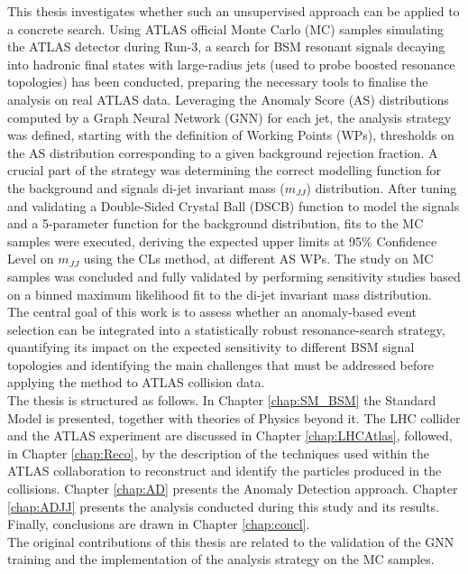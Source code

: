 This thesis investigates whether such an unsupervised approach can be applied to a concrete search. Using ATLAS official Monte Carlo (MC) samples simulating the ATLAS detector during Run-3, a search for BSM resonant signals decaying into hadronic final states with large-radius jets (used to probe boosted resonance topologies) has been conducted, preparing the necessary tools to finalise the analysis on real ATLAS data. Leveraging the Anomaly Score (AS) distributions computed by a Graph Neural Network (GNN) for each jet, the analysis strategy was defined, starting with the definition of Working Points (WPs), thresholds on the AS distribution corresponding to a given background rejection fraction. A crucial part of the strategy was determining the correct modelling function for the background and signals di-jet invariant mass ($m_{JJ}$) distribution. After tuning and validating a Double-Sided Crystal Ball (DSCB) function to model the signals and a 5-parameter function for the background distribution, fits to the MC samples were executed, deriving the expected
upper limits at 95\% Confidence Level on $m_{JJ}$ using the CLs method, at different AS WPs. The study on MC samples was concluded and fully validated by performing sensitivity studies based on a binned maximum likelihood fit to the di-jet invariant mass distribution.\\
The central goal of this work is to assess whether an anomaly-based event selection can be integrated into a statistically robust resonance-search strategy, quantifying its impact on the expected sensitivity to different BSM signal topologies and identifying the main challenges that must be addressed before applying the method to ATLAS collision data.\\
The thesis is structured as follows. In Chapter \ref{chap:SM_BSM} the Standard Model is presented, together with theories of Physics beyond it. 
The LHC collider and the ATLAS experiment are discussed in Chapter \ref{chap:LHCAtlas}, followed, in Chapter \ref{chap:Reco}, by the description of the techniques used within the ATLAS collaboration to reconstruct and identify the particles produced in the collisions.
Chapter \ref{chap:AD} presents the Anomaly Detection approach.
Chapter \ref{chap:ADJJ} presents the analysis conducted during this study and its results.
Finally, conclusions are drawn in Chapter \ref{chap:concl}.\\[1em]
The original contributions of this thesis are related to the validation of the GNN training and the implementation of the analysis strategy on the MC samples.
